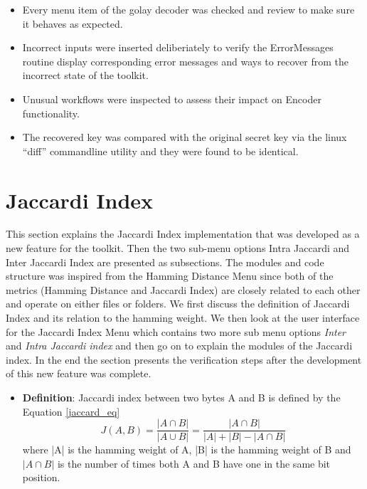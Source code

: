 	\begin{itemize}\itemsep-\the\parsep
		\item Every menu item of the golay decoder was checked and review to make sure it behaves as expected.
		\item Incorrect inputs were inserted deliberiately to verify the ErrorMessages routine display corresponding error messages and ways to recover from the incorrect state of the toolkit.
		\item Unusual workflows were inspected to assess their impact on Encoder functionality.
		\item The recovered key was compared with the original secret key via the linux ``diff'' commandline utility and they were found to be identical.
	\end{itemize}

	\section{Jaccardi Index}
	\label{jaccardi_index_section}
	This section explains the Jaccardi Index implementation that was developed as a new feature for the toolkit. Then the two sub-menu options Intra Jaccardi and Inter Jaccardi Index are presented as subsections.
	The modules and code structure was inspired from the Hamming Distance Menu since both of the metrics (Hamming Distance and Jaccardi Index) are closely related to each other and operate on either files or folders. We first discuss the definition of Jaccardi Index and its relation to the hamming weight. We then look at the user interface for the Jaccardi Index Menu which contains two more sub
	menu options \emph{Inter} and \emph{Intra Jaccardi index} and then go on to explain the modules of the Jaccardi index. In the end the section presents the verification steps after the development of this new feature was complete.\\

	\begin{itemize}
		\item \textbf{Definition}: Jaccardi index between two bytes A and B is defined by the Equation \ref{jaccard_eq}
		\begin{equation}
		J(A,B) = \frac {|A \cap B|} {|A\cup B|} = \frac{|A \cap B|} {|A| + |B| - |A \cap B|}
		\label{jaccard_eq}
		\end{equation}
		where |A| is the hamming weight of A, |B| is the hamming weight of B and $|A \cap B|$ is the number of times both A and B have one in the same bit position.
	\end{itemize}

